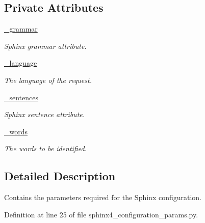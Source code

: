 \subsection*{Private Attributes}
\begin{DoxyCompactItemize}
\item 
\hyperlink{classrapp__speech__detection__sphinx4_1_1sphinx4__configuration__params_1_1SphinxConfigurationParams_a38df1b7d3f1b19f3fb335ccf1a7e181d}{\-\_\-grammar}
\begin{DoxyCompactList}\small\item\em Sphinx grammar attribute. \end{DoxyCompactList}\item 
\hyperlink{classrapp__speech__detection__sphinx4_1_1sphinx4__configuration__params_1_1SphinxConfigurationParams_a56cc14a8b1f9f7369f5fcd41b892830f}{\-\_\-language}
\begin{DoxyCompactList}\small\item\em The language of the request. \end{DoxyCompactList}\item 
\hyperlink{classrapp__speech__detection__sphinx4_1_1sphinx4__configuration__params_1_1SphinxConfigurationParams_aae72d0d46abac2ff13fe9d6d94e34fdf}{\-\_\-sentences}
\begin{DoxyCompactList}\small\item\em Sphinx sentence attribute. \end{DoxyCompactList}\item 
\hyperlink{classrapp__speech__detection__sphinx4_1_1sphinx4__configuration__params_1_1SphinxConfigurationParams_a668f07761930a1858db80c5711f3c84d}{\-\_\-words}
\begin{DoxyCompactList}\small\item\em The words to be identified. \end{DoxyCompactList}\end{DoxyCompactItemize}


\subsection{Detailed Description}
Contains the parameters required for the Sphinx configuration. 

Definition at line 25 of file sphinx4\-\_\-configuration\-\_\-params.\-py.




